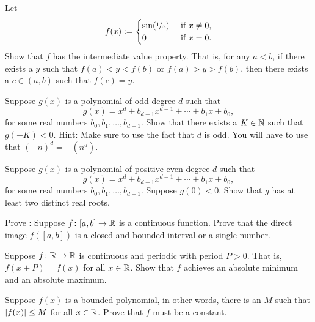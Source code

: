 \begin{exercise}
Let
\begin{equation*}
f(x) :=
\begin{cases}
\sin(\nicefrac{1}{x}) & \text{ if $x \not= 0$,} \\
0 & \text{ if $x=0$.}
\end{cases}
\end{equation*}
Show that $f$ has the intermediate value property.
That is, for any $a < b$, if there exists a $y$ such that $f(a) < y < f(b)$
or $f(a) > y > f(b)$, then
there exists a $c \in (a,b)$ such that $f(c) = y$.
\end{exercise}

\begin{exercise}
Suppose $g(x)$ is a polynomial of odd degree $d$ such that
\begin{equation*}
g(x) = x^d + b_{d-1} x^{d-1} + \cdots + b_1 x + b_0 ,
\end{equation*}
for some real numbers $b_{0}, b_1, \ldots, b_{d-1}$.  Show that there exists
a $K \in {\mathbb{N}}$ such that $g(-K) < 0$.  Hint: Make sure to use the fact that
$d$ is odd.  You will have to use that ${(-n)}^d = -(n^d)$.
\end{exercise}

\begin{exercise}
Suppose $g(x)$ is a polynomial of positive even degree $d$ such that
\begin{equation*}
g(x) = x^d + b_{d-1} x^{d-1} + \cdots + b_1 x + b_0 ,
\end{equation*}
for some real numbers $b_{0}, b_1, \ldots, b_{d-1}$.  Suppose 
$g(0) < 0$.  Show that $g$ has at least two distinct real roots.
\end{exercise}

\begin{exercise}
Prove :
Suppose $f \colon [a,b] \to {\mathbb{R}}$ is a continuous function.  Prove
that the direct image $f([a,b])$ is a closed and bounded interval or
a single number.
\end{exercise}

\begin{exercise}
Suppose $f \colon {\mathbb{R}} \to {\mathbb{R}}$ is continuous and periodic with period
$P > 0$.  That is, $f(x+P) = f(x)$ for all $x \in {\mathbb{R}}$.  Show that $f$
achieves an absolute minimum and an absolute maximum.
\end{exercise}

\begin{exercise}[Challenging]
Suppose $f(x)$ is a bounded polynomial,
in other words, there is an $M$ such that $\left\lvert {f(x)} \right\rvert \leq M$
for all $x \in {\mathbb{R}}$.  Prove that $f$ must be a constant.
\end{exercise}

